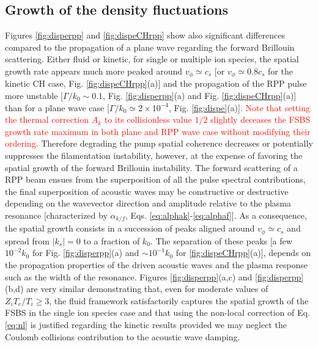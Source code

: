\documentclass[
 reprint,
 superscriptaddress,
 amsmath,amssymb,
 aps,
]{revtex4-1}
\def\tc{\textcolor{red}}
\begin{document}
\subsection{Growth of the density fluctuations}
Figures \ref{fig:disperpp} and \ref{fig:dispeCHrpp} show also significant differences compared to the propagation of a plane wave  regarding the forward Brillouin scattering.  
Either fluid or kinetic, for single or multiple ion species, 
the spatial growth rate appears much more peaked around $v_\phi\simeq c_s$ [or $v_\phi\simeq 0.8c_s$ for  the kinetic CH case, Fig. \ref{fig:dispeCHrpp}(a)] and the propagation of the RPP pulse more unstable  [$\Gamma/k_0\sim 0.1$, Fig.  \ref{fig:disperpp}(a) and Fig.  \ref{fig:dispeCHrpp}(a)]  than for a plane wave case  [$\Gamma/k_0\simeq 2 \times 10^{-4}$, Fig.  \ref{fig:dispe}(a)].
\tc{Note that setting the thermal correction $A_k$ to its collisionless value $1/2$  slightly deceases the FSBS growth rate maximum in both plane and RPP wave case without modifying their ordering.  }
Therefore degrading the pump spatial coherence decreases or potentially suppresses the filamentation instability, however, at the expense of favoring the  spatial growth of the forward Brillouin instability.
The forward scattering of a RPP beam ensues from the superposition of all the pulse spectral contributions, the final superposition of acoustic waves may be constructive or destructive depending on the wavevector direction and amplitude relative to the plasma resonance [characterized by $\alpha_{k/f}$, Eqs. \eqref{eq:alphak}-\eqref{eq:alphaf}]. 
As a consequence, the spatial growth consists in a succession of peaks aligned around $v_\phi\simeq c_s$ and spread from $\vert k_s\vert=0$ to a fraction of $k_0$. The separation of these peaks [a few $ 10^{-2}k_0$ for Fig. \ref{fig:disperpp}(a) and $\sim 10^{-1}k_0$ for \ref{fig:dispeCHrpp}(a)], depends on the propagation properties of the driven acoustic waves and the plasma response such as the width of the resonance. 
Figures \ref{fig:disperpp}(a,c) and  \ref{fig:disperpp}(b,d) are very similar demonstrating that, even for moderate values of $Z_iT_e/T_i\ge3$, the fluid framework satisfactorily captures the spatial growth of the FSBS in the single ion species case and that using the non-local correction of Eq. \eqref{eq:nl} is justified regarding the kinetic results provided we may neglect the Coulomb collisions contribution to the acoustic wave damping.
\end{document}

